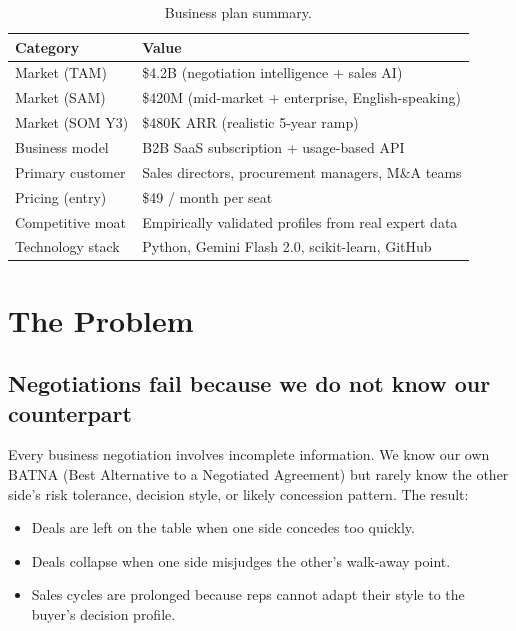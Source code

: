 \documentclass[11pt, a4paper, oneside]{report}
\begin{document}
\begin{table}[H]
\centering\small
\caption{Business plan summary.}
\begin{tabular}{ll}
\toprule
\textbf{Category} & \textbf{Value} \\
\midrule
Market (TAM)      & \$4.2B (negotiation intelligence + sales AI) \\
Market (SAM)      & \$420M (mid-market + enterprise, English-speaking) \\
Market (SOM Y3)   & \$480K ARR (realistic 5-year ramp) \\
Business model    & B2B SaaS subscription + usage-based API \\
Primary customer  & Sales directors, procurement managers, M\&A teams \\
Pricing (entry)   & \$49 / month per seat \\
Competitive moat  & Empirically validated profiles from real expert data \\
Technology stack  & Python, Gemini Flash 2.0, scikit-learn, GitHub \\
\bottomrule
\end{tabular}
\end{table}

\chapter{The Problem}
\label{ch:problem}

\section{Negotiations fail because we do not know our counterpart}

Every business negotiation involves incomplete information. We know our
own BATNA (Best Alternative to a Negotiated Agreement) but rarely know
the other side's risk tolerance, decision style, or likely concession
pattern. The result:

\begin{itemize}[leftmargin=*]
    \item Deals are left on the table when one side concedes too quickly.
    \item Deals collapse when one side misjudges the other's walk-away point.
    \item Sales cycles are prolonged because reps cannot adapt their style
          to the buyer's decision profile.
\end{itemize}
\end{document}
